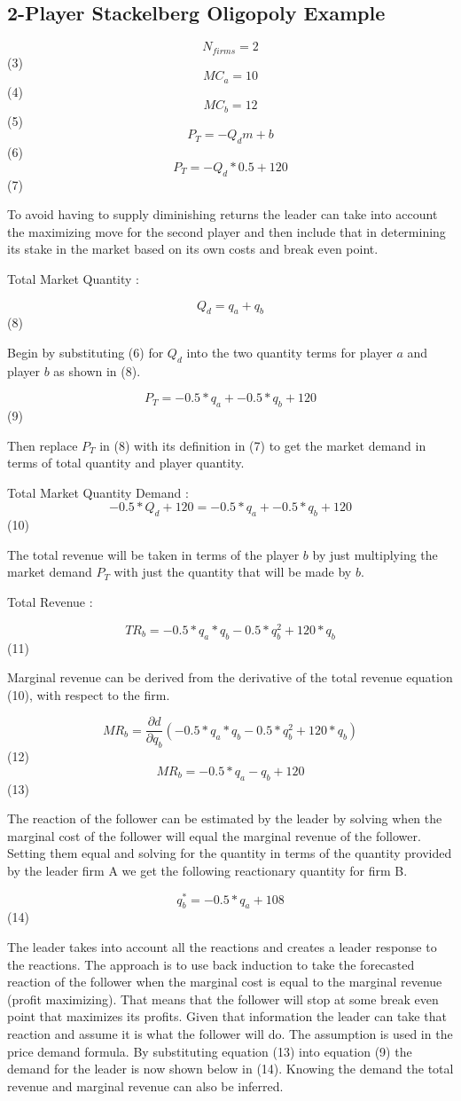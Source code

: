 \documentclass[phd, 12pt, print]{fauthesis}
\begin{document}
\subsection{2-Player Stackelberg Oligopoly Example}

$$ N_{firms} = 2$$ (3)
$$ MC_{a} = 10$$ (4)
$$ MC_{b} = 12$$ (5)
$$ P_{T} = -Q_{d}m+b$$ (6)
$$ P_{T} = -Q_{d}*0.5+120$$ (7)

To avoid having to supply diminishing returns the leader can take 
into account the maximizing move for the second player and then 
include that in determining its stake in the market based on its 
own costs and break even point.

Total Market Quantity :

$$ Q_{d}= q_{a} + q_{b}$$(8)

Begin by substituting (6) for $Q_{d}$ into the 
two quantity terms for player ${a}$ and player ${b}$ as shown in (8). 

$$ P_{T} = -0.5*q_{a} + -0.5*q_{b} + 120$$ (9)

Then replace $P_{T}$ in (8) with its definition in (7) to get the market demand
in terms of total quantity and player quantity.  

Total Market Quantity Demand :
$$ -0.5*Q_{d} + 120 = -0.5*q_{a} + -0.5*q_{b} + 120$$ (10)

The total revenue will be taken in terms of the player $b$ 
by just multiplying the market demand $P_{T}$ with just the 
quantity that will be made by $b$.

Total Revenue :

$$TR_{b} = -0.5*q_{a}*q_{b} - 0.5*q_{b}^2 + 120*q_{b}$$ (11)

Marginal revenue can be derived from the derivative of the total 
revenue equation (10), with respect to the firm.

$$ MR_{b} = \frac{\partial d}{\partial q_{b}}(-0.5*q_{a}*q_{b} - 0.5*q_{b}^2 + 120*q_{b})$$ (12)
$$ MR_{b} = -0.5*q_{a} - q_{b} + 120$$ (13)

The reaction of the follower can be estimated by the leader by 
solving when the marginal cost of the follower will equal the 
marginal revenue of the follower. Setting them equal and solving 
for the quantity in terms of the quantity provided by the leader 
firm A we get the following reactionary quantity for firm B.

$$ q_{b}^* = -0.5*q_{a} + 108$$ (14)

The leader takes into account all the reactions and creates a 
leader response to the reactions. The approach is to use back 
induction to take the forecasted reaction of the follower when 
the marginal cost is equal to the marginal revenue (profit maximizing). 
That means that the follower will stop at some break even point 
that maximizes its profits. Given that information the leader can 
take that reaction and assume it is what the follower will do. 
The assumption is used in the price demand formula. By substituting 
equation (13) into equation (9) the demand for the leader is now 
shown below in (14). Knowing the demand the total revenue and 
marginal revenue can also be inferred.
\end{document}
